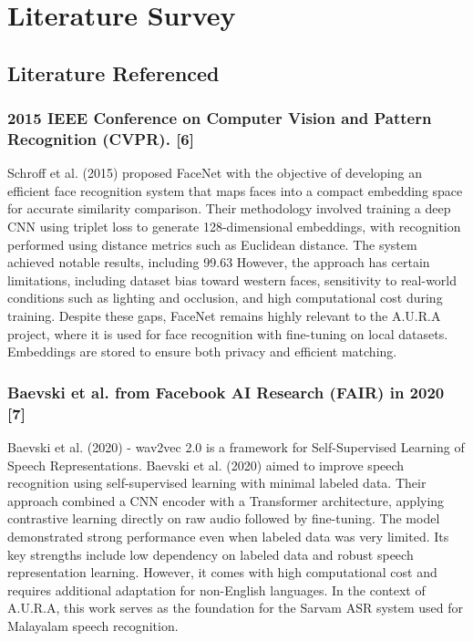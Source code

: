 \chapter{Literature Survey}

\setcounter{equation}{0}
\section{Literature Referenced}
\subsection{2015 IEEE Conference on Computer Vision and Pattern Recognition (CVPR). [6]}
Schroff et al. (2015) proposed FaceNet with the objective of developing an efficient face recognition system that maps faces into a compact embedding space for accurate similarity comparison. Their methodology involved training a deep CNN using triplet loss to generate 128-dimensional embeddings, with recognition performed using distance metrics such as Euclidean distance.
The system achieved notable results, including 99.63%
However, the approach has certain limitations, including dataset bias toward western faces, sensitivity to real-world conditions such as lighting and occlusion, and high computational cost during training. Despite these gaps, FaceNet remains highly relevant to the A.U.R.A project, where it is used for face recognition with fine-tuning on local datasets. Embeddings are stored to ensure both privacy and efficient matching.

\subsection{ Baevski et al. from Facebook AI Research (FAIR) in 2020 [7]}
Baevski et al. (2020) - wav2vec 2.0 is a framework for Self-Supervised Learning of Speech Representations. Baevski et al. (2020) aimed to improve speech recognition using self-supervised learning with minimal labeled data. Their approach combined a CNN encoder with a Transformer architecture, applying contrastive learning directly on raw audio followed by fine-tuning. The model demonstrated strong performance even when labeled data was very limited. Its key strengths include low dependency on labeled data and robust speech representation learning. However, it comes with high computational cost and requires additional adaptation for non-English languages. In the context of A.U.R.A, this work serves as the foundation for the Sarvam ASR system used for Malayalam speech recognition.

